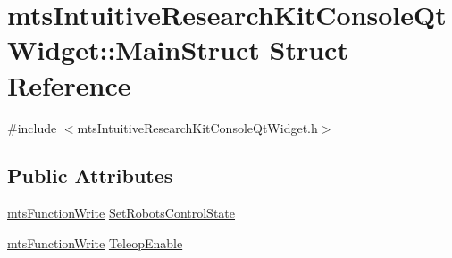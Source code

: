 \hypertarget{structmts_intuitive_research_kit_console_qt_widget_1_1_main_struct}{\section{mts\-Intuitive\-Research\-Kit\-Console\-Qt\-Widget\-:\-:Main\-Struct Struct Reference}
\label{structmts_intuitive_research_kit_console_qt_widget_1_1_main_struct}
}


{\ttfamily \#include $<$mts\-Intuitive\-Research\-Kit\-Console\-Qt\-Widget.\-h$>$}

\subsection*{Public Attributes}
\begin{DoxyCompactItemize}
\item 
\hyperlink{classmts_function_write}{mts\-Function\-Write} \hyperlink{structmts_intuitive_research_kit_console_qt_widget_1_1_main_struct_a85aa4b393edb269c840118151566d905}{Set\-Robots\-Control\-State}
\item 
\hyperlink{classmts_function_write}{mts\-Function\-Write} \hyperlink{structmts_intuitive_research_kit_console_qt_widget_1_1_main_struct_ae4f56798ee1b99c826165cacd67d0ef3}{Teleop\-Enable}
\end{DoxyCompactItemize}


